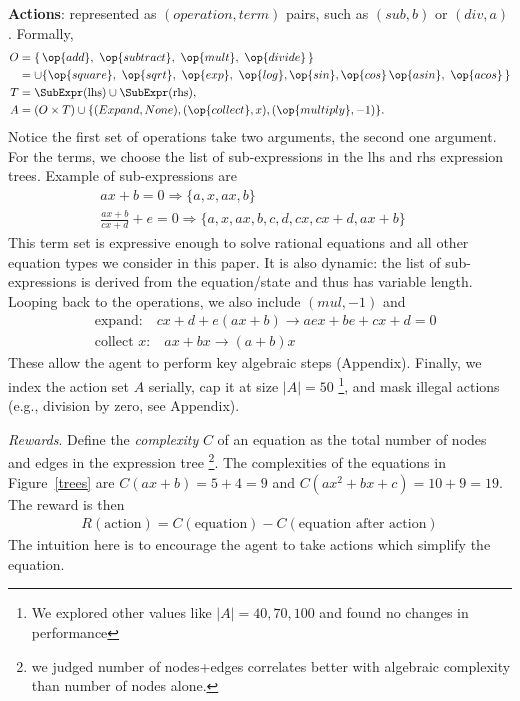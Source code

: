\documentclass{article}
\theoremstyle{plain}
\theoremstyle{definition}
\theoremstyle{remark}
\begin{document}
\textbf{Actions}: represented as $(operation, term)$ pairs, such as $(sub, b)$ or $(div,a)$. Formally,
\begin{align}
O &= \{\,\op{add},\ \op{subtract},\ \op{mult},\ \op{divide}\,\} \nonumber \\
   &= \cup  \{\op{square}, \ \op{sqrt},\ \op{exp},\ \op{log}, \op{sin}, \op{cos}\, \op{asin},\ \op{acos}\,\} \\
T   &= \SubExpr(\text{lhs}) \cup \SubExpr(\text{rhs}), \\
A   &= (O \times T) \cup \{(Expand, None),  (\op{collect}, x), (\op{multiply}, -1)\}.
\end{align}
Notice the first set of operations take two arguments, the second one argument. For the terms, we choose the list of sub-expressions in the lhs and rhs expression trees. Example of sub-expressions are
\begin{align}
& ax+b=0 \Rightarrow \{a, x, ax, b\} & \quad  \\
& \frac{ax+b}{cx+d}+e=0 \Rightarrow \{a, x, ax, b, c, d, cx, cx+d, ax+b\} 
\end{align}
This term set is expressive enough to solve rational equations and all other equation types we consider in this paper. It is also dynamic: the list of sub-expressions is derived from the equation/state and thus has variable length. Looping back to the operations, we also include $(mul,-1)$ and
\begin{align*}
    & \text{expand:} \quad cx + d + e(ax + b) \rightarrow aex + be + cx + d = 0 \\
    & \text{collect $x$:}  \quad  ax + bx \rightarrow (a + b)x \
\end{align*}
These allow the agent to perform key algebraic steps (Appendix). Finally, we index the action set \(A\) serially, cap it at size \(|A|=50\) \footnote{We explored other values like $|A| = 40, 70, 100$ and found no changes in performance}, and mask illegal actions (e.g., division by zero, see Appendix). 

\textit{Rewards}. Define the \textit{complexity} $C$ of an equation as the total number of nodes and edges in the expression tree \footnote{we judged number of nodes+edges correlates better with algebraic complexity than number of nodes alone.}. The complexities of the equations in Figure~\ref{trees} are $C(ax+b) = 5 + 4 = 9$ and $C(ax^2 + bx + c) =  10 + 9 = 19$. The reward is then
\begin{align}
    R(\text{action}) = C(\text{equation}) - C(\text{equation after action})
\end{align}
The intuition here is to encourage the agent to take actions which simplify the equation. 
\end{document}
